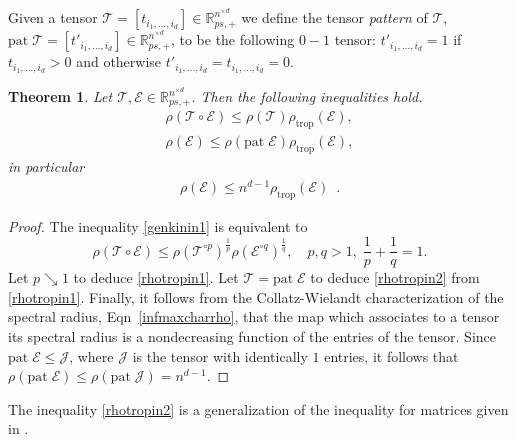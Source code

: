 \documentclass{amsart}
\newcommand{\R}{\mathbb{R}}
\newcommand{\0}{\mathbf{0}}
\newcommand{\1}{\mathbf{1}}
\newcommand{\cE}{\mathcal{E}}
\newcommand{\cJ}{\mathcal{J}}
\newcommand{\cT}{\mathcal{T}}
\newcommand{\pat}{\mathrm{pat}\;}
\newcommand{\trop}{\mathrm{trop}}
\newtheorem{theorem}[theo]{Theorem}
\theoremstyle{remark}
\numberwithin{equation}{section} %
\renewcommand{\leq}{\leqslant}
\renewcommand{\le}{\leqslant}
\begin{document}
%
%
%
%

 Given a tensor $\cT=[t_{i_1,\ldots,i_d}]\in\R_{ps,+}^{n^{\times d}}$ we define 
 the tensor \emph{pattern} of $\cT$, 
$\pat \cT=[t'_{i_1,\ldots,i_d}]\in \R_{ps,+}^{n^{\times d}}$,
to be the following $0-1$ tensor:  $t'_{i_1,\ldots,i_d}=1$ if $t_{i_1,\ldots,i_d}>0$ and otherwise
 $t'_{i_1,\ldots,i_d}=t_{i_1,\ldots,i_d}=0$.
 \begin{theorem}\label{rhotropin}  Let $\cT,\cE\in \R_{ps,+}^{n^{\times d}}$.  Then the following inequalities hold.
 \begin{eqnarray}\label{rhotropin1}
 \rho(\cT\circ\cE)\le \rho(\cT)\rho_{\trop}(\cE),\\
 \rho(\cE)\le \rho(\pat \cE)\rho_{\trop}(\cE),  \label{rhotropin2}
 \end{eqnarray}
in particular
%
\begin{eqnarray}
 \rho(\cE)\leq {n^{d-1}}\rho_{\trop}(\cE) \enspace .  \label{rhotropin3}
\end{eqnarray}
 \end{theorem}
 \begin{proof}
 The inequality \eqref{genkinin1} is equivalent to
 \begin{equation}\label{genkinin1A}
 \rho(\cT\circ \cE)\le \rho(\cT^{\circ p})^{\frac{1}{p}}  \rho(\cE^{\circ q})^{\frac{1}{q}}, \quad p,q >1,\; \frac{1}{p}+\frac{1}{q}=1.
 \end{equation}
 Let $p\searrow 1$ to deduce \eqref{rhotropin1}.  Let $\cT=\pat \cE$ to deduce \eqref{rhotropin2} from \eqref{rhotropin1}. 
%
Finally, it follows from the Collatz-Wielandt characterization of the spectral radius, Eqn~\eqref{infmaxcharrho},
that the map which associates to a tensor its spectral radius is a nondecreasing function of the entries of the tensor. Since $\pat \cE\leq \cJ$, where $\cJ$ is the tensor with identically $1$ entries, it follows that $\rho(\pat\cE)\leq \rho(\pat\cJ)=n^{d-1}$. \end{proof}

 The inequality \eqref{rhotropin2} is a generalization of the inequality for matrices given in \cite{Fri86}.
\end{document}

